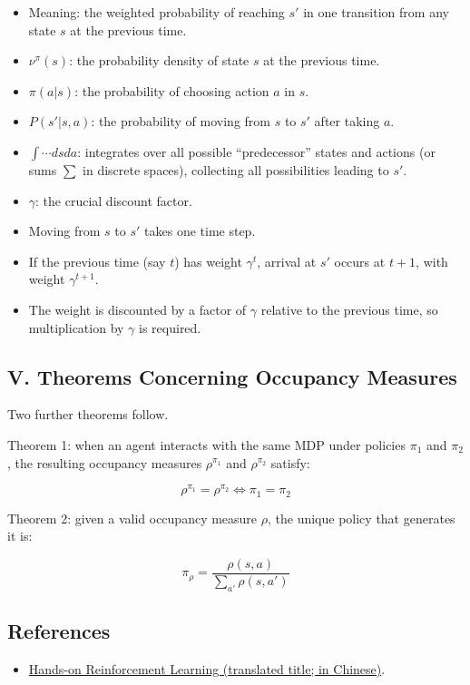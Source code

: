 \begin{itemize}
\tightlist
\item
  Meaning: the weighted probability of reaching \(s'\) in one transition from any state \(s\) at the previous time.
\item
  \(\nu^\pi(s)\): the probability density of state \(s\) at the previous time.
\item
  \(\pi(a|s)\): the probability of choosing action \(a\) in \(s\).
\item
  \(P(s'|s,a)\): the probability of moving from \(s\) to \(s'\) after taking \(a\).
\item
  \(\int \cdots dsda\): integrates over all possible ``predecessor'' states and actions (or sums \(\sum\) in discrete spaces), collecting all possibilities leading to \(s'\).
\item
  \(\gamma\): the crucial discount factor.
\item
  Moving from \(s\) to \(s'\) takes one time step.
\item
  If the previous time (say \(t\)) has weight \(\gamma^t\), arrival at \(s'\) occurs at \(t+1\), with weight \(\gamma^{t+1}\).
\item
  The weight is discounted by a factor of \(\gamma\) relative to the previous time, so multiplication by \(\gamma\) is required.
\end{itemize}

\hypertarget{v.-theorems-concerning-occupancy-measures}{%
\subsection{V. Theorems Concerning Occupancy Measures}\label{v.-theorems-concerning-occupancy-measures}}

Two further theorems follow.

Theorem 1: when an agent interacts with the same MDP under policies \(\pi_1\) and \(\pi_2\), the resulting occupancy measures \(\rho^{\pi_1}\) and \(\rho^{\pi_2}\) satisfy:

\[
\rho^{\pi_1} = \rho^{\pi_2} \Longleftrightarrow \pi_1 = \pi_2
\]

Theorem 2: given a valid occupancy measure \(\rho\), the unique policy that generates it is:

\[
\pi_\rho = \frac{\rho(s,a)}{\sum_{a'}\rho(s,a')}
\]

\FloatBarrier
{}
\hypertarget{references-44}{%
\subsection{References}\label{references-44}}

\vspace{0.25em}
\begin{itemize}
\tightlist
\item
  \href{https://hrl.boyuai.com/}{Hands-on Reinforcement Learning (translated title; in Chinese)}.
\end{itemize}

\clearpage
